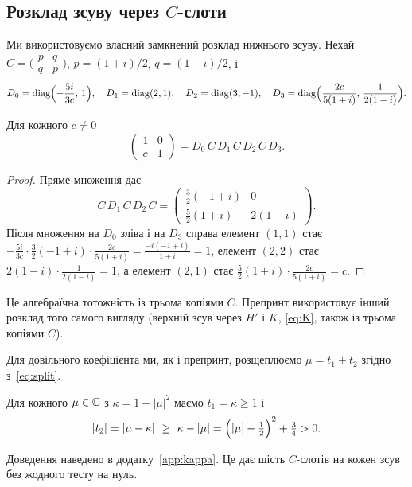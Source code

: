 \documentclass[11pt]{article}
\theoremstyle{plain}
\DeclareMathOperator{\diag}{diag}
\newcommand{\abs}[1]{\lvert #1\rvert}
\begin{document}
\subsection{Розклад зсуву через \texorpdfstring{$C$}{C}-слоти}\label{sec:cslots}
Ми використовуємо власний замкнений розклад нижнього зсуву. Нехай $C=\bigl(\begin{smallmatrix}p&q\\q&p\end{smallmatrix}\bigr)$, $p=(1+i)/2$, $q=(1-i)/2$, і
\begin{equation}\label{eq:D}
D_0=\diag\Bigl(-\frac{5i}{3c},\,1\Bigr),\quad D_1=\diag(2,1),\quad D_2=\diag(3,-1),\quad D_3=\diag\Bigl(\frac{2c}{5(1+i)},\,\frac{1}{2(1-i)}\Bigr).
\end{equation}
\begin{lemma}\label{lem:shear}
Для кожного $c\ne0$
\begin{equation}\label{eq:shear}
\begin{pmatrix}1&0\\c&1\end{pmatrix}=D_0\,C\,D_1\,C\,D_2\,C\,D_3 .
\end{equation}
\end{lemma}
\begin{proof}
Пряме множення дає
\begin{equation}\label{eq:CDCDC}
C\,D_1\,C\,D_2\,C=\begin{pmatrix}\frac32(-1+i)&0\\[2pt]\frac52(1+i)&2(1-i)\end{pmatrix}.
\end{equation}
Після множення на $D_0$ зліва і на $D_3$ справа елемент $(1,1)$ стає $-\frac{5i}{3c}\cdot\frac32(-1+i)\cdot\frac{2c}{5(1+i)}=\frac{-i(-1+i)}{1+i}=1$, елемент $(2,2)$ стає $2(1-i)\cdot\frac{1}{2(1-i)}=1$, а елемент $(2,1)$ стає $\frac52(1+i)\cdot\frac{2c}{5(1+i)}=c$.
\end{proof}
Це алгебраїчна тотожність із трьома копіями $C$. Препринт використовує інший розклад того самого вигляду (верхній зсув через $H'$ і $K$, \eqref{eq:K}, також із трьома копіями $C$).

Для довільного коефіцієнта ми, як і препринт, розщеплюємо $\mu=t_1+t_2$ згідно з~\eqref{eq:split}.
\begin{lemma}\label{lem:split}
Для кожного $\mu\in\mathbb{C}$ з $\kappa=1+\abs{\mu}^2$ маємо $t_1=\kappa\ge1$ і
\begin{equation}\label{eq:kappa}
\abs{t_2}=\abs{\mu-\kappa}\ \ge\ \kappa-\abs{\mu}=\Bigl(\abs{\mu}-\tfrac12\Bigr)^2+\tfrac34>0 .
\end{equation}
\end{lemma}
Доведення наведено в додатку~\ref{app:kappa}. Це дає шість $C$-слотів на кожен зсув без жодного тесту на нуль.
\end{document}
